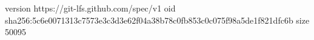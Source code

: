 version https://git-lfs.github.com/spec/v1
oid sha256:5c6e0071313c7573e3c3d3e62f04a38b78c0fb853c0c075f98a5de1f821dfc6b
size 50095
